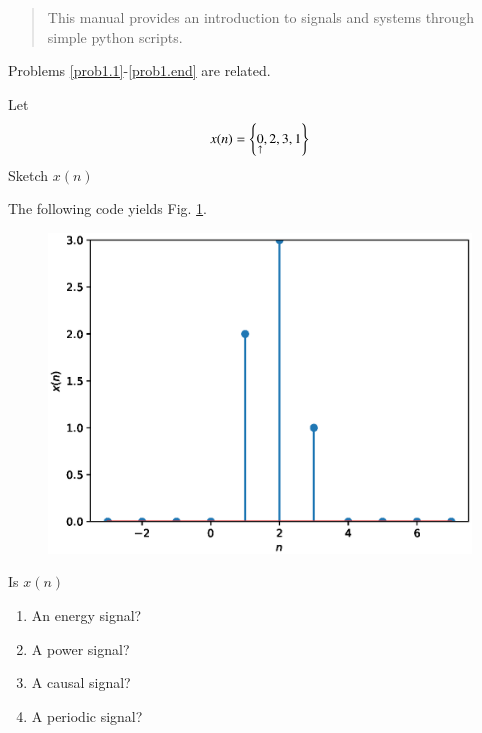 \documentclass[journal,12pt,twocolumn]{IEEEtran}
\begin{document}
%
\IEEEpeerreviewmaketitle

\bigskip

\begin{abstract}
This manual provides an introduction to signals and systems through simple python scripts.   
\end{abstract}


Problems \ref{prob1.1}-\ref{prob1.end} are related.
\begin{problem}
\label{prob1.1}
Let
\begin{equation}
x(n) = \left\{\underset{\uparrow}{0},2,3,1\right\}
\end{equation}
Sketch $x(n)$
\end{problem}
\solution The following code yields Fig. \ref{fig_3a}.

\begin{figure}[!h]
\begin{center}
\includegraphics[width=\columnwidth]{./figs/3a}
\end{center}
\label{fig_3a}	
\end{figure}
%
\begin{problem}
Is $x(n)$
\begin{enumerate}
\item An energy signal?
\item A power signal?
\item A causal signal?
\item A periodic signal?
\end{enumerate}
\end{problem}
\end{document}
